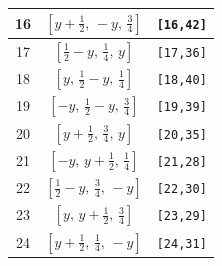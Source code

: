 \documentclass[fleqn,8pt]{jsarticle}
\begin{document}
\begin{longtable}{ccc}
16 & $\left[ y + \frac{1}{2},\, - y,\, \frac{3}{4} \right]$ & {\tt [16,42]} \\ \hline
17 & $\left[ \frac{1}{2} - y,\, \frac{1}{4},\, y \right]$ & {\tt [17,36]} \\ \hline
18 & $\left[ y,\, \frac{1}{2} - y,\, \frac{1}{4} \right]$ & {\tt [18,40]} \\ \hline
19 & $\left[ - y,\, \frac{1}{2} - y,\, \frac{3}{4} \right]$ & {\tt [19,39]} \\ \hline
20 & $\left[ y + \frac{1}{2},\, \frac{3}{4},\, y \right]$ & {\tt [20,35]} \\ \hline
21 & $\left[ - y,\, y + \frac{1}{2},\, \frac{1}{4} \right]$ & {\tt [21,28]} \\ \hline
22 & $\left[ \frac{1}{2} - y,\, \frac{3}{4},\, - y \right]$ & {\tt [22,30]} \\ \hline
23 & $\left[ y,\, y + \frac{1}{2},\, \frac{3}{4} \right]$ & {\tt [23,29]} \\ \hline
24 & $\left[ y + \frac{1}{2},\, \frac{1}{4},\, - y \right]$ & {\tt [24,31]} \\
\end{longtable}
\renewcommand{\arraystretch}{1.2}
\end{document}
